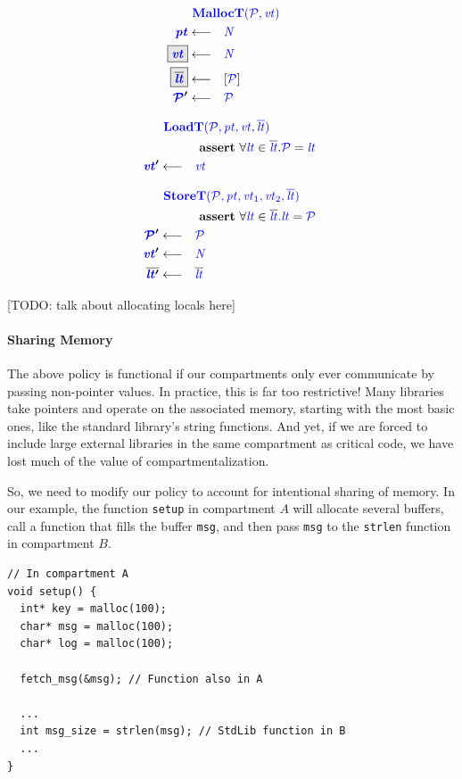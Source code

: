 \documentclass[acmsmall,review,anonymous]{acmart}\settopmatter{printfolios=true,printccs=false,printacmref=false}
\begin{document}
\begin{minipage}[t]{0.25\textwidth}
\[\begin{aligned}
\truledef{\malloct}
\settag{\pt}{\N}
\settagopt{\vt}{\N}
\settagopt{\overline{\lt}}{\left[\PCT\right]}
\settag{\PCT'}{\PCT}
\end{aligned}\]
\end{minipage}
\begin{minipage}[t]{0.3\textwidth}
\[\begin{aligned}
\truledef{\loadt}
\assert{\forall \lt \in \overline{\lt} . \PCT = \lt}
\settag{\vt'}{\vt}
\end{aligned}\]
\end{minipage}
\begin{minipage}[t]{0.5\textwidth}
\[\begin{aligned}
\truledef{\storet}
\assert{\forall \lt \in \overline{\lt} . \lt = \PCT}
\settag{\PCT'}{\PCT}
\settag{\vt'}{\N}
\settag{\overline{\lt'}}{\overline{\lt}}
\end{aligned}\]
\end{minipage}

[TODO: talk about allocating locals here]

\paragraph{Sharing Memory}

The above policy is functional if our compartments only ever communicate by passing
non-pointer values. In practice, this is far too restrictive! Many libraries take pointers
and operate on the associated memory, starting with the most basic ones, like the
standard library's string functions. And yet, if we are forced to include large
external libraries in the same compartment as critical code, we have lost much of
the value of compartmentalization.

So, we need to modify our policy to account for intentional sharing of memory.
In our example, the function {\tt setup} in compartment \(A\) will allocate several
buffers, call a function that fills the buffer {\tt msg}, and then pass {\tt msg}
to the {\tt strlen} function in compartment \(B\).

\begin{verbatim}
// In compartment A
void setup() {
  int* key = malloc(100);
  char* msg = malloc(100);
  char* log = malloc(100);

  fetch_msg(&msg); // Function also in A

  ...
  int msg_size = strlen(msg); // StdLib function in B
  ...
}
\end{verbatim}
\end{document}
